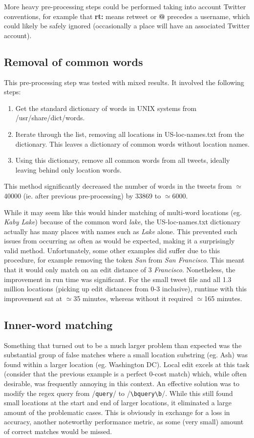 \documentclass[twocolumn]{article}
\begin{document}
More heavy pre-processing steps could be performed taking into account Twitter conventions, for example that \textbf{rt:} means retweet or \textbf{@} precedes a username, which could likely be safely ignored (occasionally a place will have an associated Twitter account).

\subsection{Removal of common words}
This pre-processing step was tested with mixed results. It involved the following steps:

\begin{enumerate}
\item Get the standard dictionary of words in UNIX systems from /usr/share/dict/words.
\item Iterate through the list, removing all locations in US-loc-names.txt from the dictionary. This leaves a dictionary of common words without location names.
\item Using this dictionary, remove all common words from all tweets, ideally leaving behind only location words.
\end{enumerate}

This method significantly decreased the number of words in the tweets from $\simeq$40000 (ie. after previous pre-processing) by 33869 to $\simeq$6000.

While it may seem like this would hinder matching of multi-word locations (eg. \textit{Kaby Lake}) because of the common word \textit{lake}, the US-loc-names.txt dictionary actually has many places with names such as \textit{Lake} alone. This prevented such issues from occurring as often as would be expected, making it a surprisingly valid method. Unfortunately, some other examples did suffer due to this procedure, for example removing the token \textit{San} from \textit{San Francisco}. This meant that it would only match on an edit distance of 3 \textit{Francisco}. Nonetheless, the improvement in run time was significant. For the small tweet file and all 1.3 million locations (picking up edit distances from 0-3 inclusive), runtime  with this improvement sat at $\simeq$35 minutes, whereas without it required $\simeq$165 minutes.

\subsection{Inner-word matching}
Something that turned out to be a much larger problem than expected was the substantial group of false matches where a small location substring (eg. Ash) was found within a larger location (eg. Washington DC). Local edit excels at this task (consider that the previous example is a perfect 0-cost match) which, while often desirable, was frequently annoying in this context. An effective solution was to modify the regex query from /\verb/query// to /\verb/\bquery\b//. While this still found small locations at the start and end of larger locations, it eliminated a large amount of the problematic cases. This is obviously in exchange for a loss in accuracy, another noteworthy performance metric, as some (very small) amount of correct matches would be missed.
\end{document}
